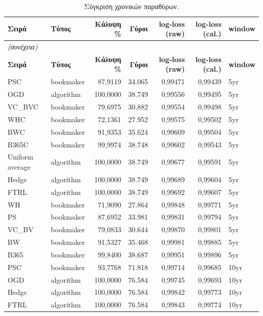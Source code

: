 {\footnotesize
\begin{longtable}{@{}llrrrrl@{}}
\caption{Σύγκριση χρονικών παραθύρων.}\label{app:pool}\\
\toprule \textbf{Σειρά} & \textbf{Τύπος} & \textbf{Κάλυψη \%} & \textbf{Γύροι} & \textbf{log-loss (raw)} & \textbf{log-loss (cal.)} & \textbf{window} \\\midrule\endfirsthead
\multicolumn{7}{l}{\emph{(συνέχεια)}}\\\toprule \textbf{Σειρά} & \textbf{Τύπος} & \textbf{Κάλυψη \%} & \textbf{Γύροι} & \textbf{log-loss (raw)} & \textbf{log-loss (cal.)} & \textbf{window} \\\midrule\endhead
\bottomrule\endfoot
PSC & bookmaker & 87,9119 & 34.065 & 0,99471 & 0,99439 & 5yr \\
OGD & algorithm & 100,0000 & 38.749 & 0,99556 & 0,99495 & 5yr \\
VC\_BVC & bookmaker & 79,6975 & 30.882 & 0,99554 & 0,99498 & 5yr \\
WHC & bookmaker & 72,1361 & 27.952 & 0,99575 & 0,99502 & 5yr \\
BWC & bookmaker & 91,9353 & 35.624 & 0,99609 & 0,99504 & 5yr \\
B365C & bookmaker & 99,9974 & 38.748 & 0,99602 & 0,99543 & 5yr \\
Uniform average & algorithm & 100,0000 & 38.749 & 0,99677 & 0,99591 & 5yr \\
Hedge & algorithm & 100,0000 & 38.749 & 0,99689 & 0,99604 & 5yr \\
FTRL & algorithm & 100,0000 & 38.749 & 0,99692 & 0,99607 & 5yr \\
WH & bookmaker & 71,9090 & 27.864 & 0,99848 & 0,99771 & 5yr \\
PS & bookmaker & 87,6952 & 33.981 & 0,99831 & 0,99794 & 5yr \\
VC\_BV & bookmaker & 79,0833 & 30.644 & 0,99870 & 0,99801 & 5yr \\
BW & bookmaker & 91,5327 & 35.468 & 0,99981 & 0,99885 & 5yr \\
B365 & bookmaker & 99,8400 & 38.687 & 0,99951 & 0,99896 & 5yr \\
PSC & bookmaker & 93,7768 & 71.818 & 0,99714 & 0,99685 & 10yr \\
OGD & algorithm & 100,0000 & 76.584 & 0,99745 & 0,99693 & 10yr \\
Hedge & algorithm & 100,0000 & 76.584 & 0,99842 & 0,99773 & 10yr \\
FTRL & algorithm & 100,0000 & 76.584 & 0,99843 & 0,99774 & 10yr \\

\end{longtable}}

